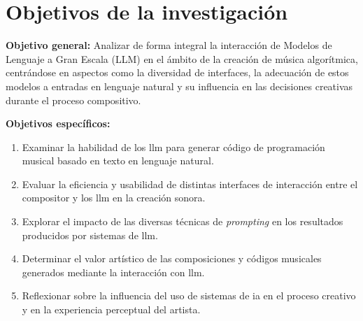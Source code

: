 \section{Objetivos de la investigación}



\textbf{Objetivo general:} Analizar de forma integral la interacción de Modelos de Lenguaje a Gran Escala (LLM) en el ámbito de la creación de música algorítmica, centrándose en aspectos como la diversidad de interfaces, la adecuación de estos modelos a entradas en lenguaje natural y su influencia en las decisiones creativas durante el proceso compositivo.

\textbf{Objetivos específicos:}
\begin{enumerate}[label=\alph*)]
    \item Examinar la habilidad de los \gls{llm} para generar código de programación musical basado en texto en lenguaje natural.
    \item Evaluar la eficiencia y usabilidad de distintas interfaces de interacción entre el compositor y los \gls{llm} en la creación sonora.
    \item Explorar el impacto de las diversas técnicas de \emph{prompting} en los resultados producidos por sistemas de \gls{llm}.
    \item Determinar el valor artístico de las composiciones y códigos musicales generados mediante la interacción con \gls{llm}.
    \item Reflexionar sobre la influencia del uso de sistemas de \gls{ia} en el proceso creativo y en la experiencia perceptual del artista.
\end{enumerate}

